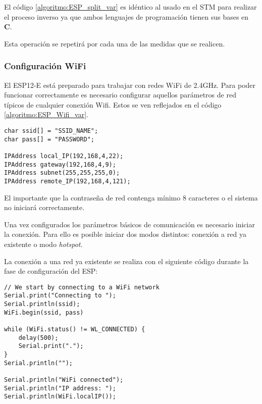 El código \ref{algoritmo:ESP_split_var} es idéntico al usado en el STM para realizar el proceso inverso ya que ambos lenguajes de programación tienen sus bases en \textbf{C}.

Esta operación se repetirá por cada una de las medidas que se realicen.

\clearpage

\subsubsection{Configuración WiFi\label{sec:Software_Arduino_Conf_WiFi}}

El ESP12-E está preparado para trabajar con redes WiFi de 2.4GHz. Para poder funcionar correctamente es necesario configurar aquellos parámetros de red típicos de cualquier conexión Wifi. Estos se ven reflejados en el código \ref{algoritmo:ESP_Wifi_var}.

\begin{lstlisting}[label=algoritmo:ESP_Wifi_var,style = STM-code,frame=single,caption=Variables y tipos de dato específicos]
char ssid[] = "SSID_NAME"; 
char pass[] = "PASSWORD"; 

IPAddress local_IP(192,168,4,22);
IPAddress gateway(192,168,4,9);
IPAddress subnet(255,255,255,0);
IPAddress remote_IP(192,168,4,121);
\end{lstlisting}
  
El importante que la contraseña de red contenga mínimo 8 caracteres o el sistema no iniciará correctamente.

Una vez configurados los parámetros básicos de comunicación es necesario iniciar la conexión. Para ello es posible iniciar dos modos distintos: conexión a red ya existente o modo \textit{hotspot}.

La conexión a una red ya existente se realiza con el siguiente código durante la fase de configuración del ESP:
  
\begin{lstlisting}[label=algoritmo:ESP_Wifi,style = STM-code,frame=single,caption=Conexión del ESP a una red WiFi ya existente]
// We start by connecting to a WiFi network
Serial.print("Connecting to ");
Serial.println(ssid);
WiFi.begin(ssid, pass)

while (WiFi.status() != WL_CONNECTED) {
	delay(500);
	Serial.print(".");
}
Serial.println("");
  
Serial.println("WiFi connected");
Serial.println("IP address: ");
Serial.println(WiFi.localIP());
\end{lstlisting}

